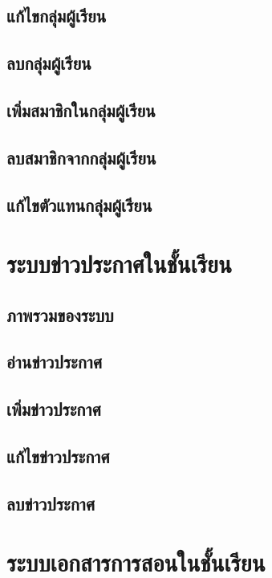 \documentclass[12pt,oneside]{book}
\begin{document}
\section{แก้ไขกลุ่มผู้เรียน}

\section{ลบกลุ่มผู้เรียน}

\section{เพิ่มสมาชิกในกลุ่มผู้เรียน}

\section{ลบสมาชิกจากกลุ่มผู้เรียน}

\section{แก้ไขตัวแทนกลุ่มผู้เรียน}

\chapter{ระบบข่าวประกาศในชั้นเรียน}

\section{ภาพรวมของระบบ}

\section{อ่านข่าวประกาศ}

\section{เพิ่มข่าวประกาศ}

\section{แก้ไขข่าวประกาศ}

\section{ลบข่าวประกาศ}

\chapter{ระบบเอกสารการสอนในชั้นเรียน}
\end{document}
